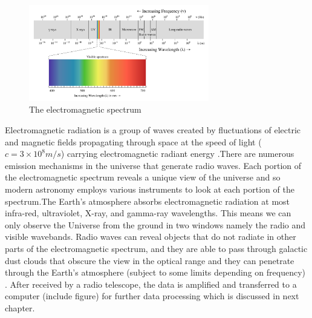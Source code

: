\begin{figure}[h!]
  \centering
    \includegraphics[width=0.7\textwidth]{images/Electromagnetic-Spectrum.png}
    \caption{The electromagnetic spectrum}
  \label{images/Electromagnetic-Spectrum.png}
\end{figure}

Electromagnetic radiation is a group of waves created by fluctuations of electric and magnetic fields propagating through space at the speed of light ($c=3\times 10^{8} m/s$) carrying electromagnetic radiant energy \citep{staats2016genetic}.\;There are numerous emission mechanisms in the universe that generate radio waves.
Each portion of the electromagnetic spectrum reveals a unique view of the universe and so modern astronomy employs various instruments to look at each portion of the spectrum.\;The Earth's atmosphere absorbs electromagnetic radiation at most infra-red, ultraviolet, X-ray, and gamma-ray wavelengths. This means we can only observe the Universe from the ground in two windows namely the radio and visible wavebands. Radio waves can reveal objects that do not radiate in other parts of the electromagnetic spectrum, and they are able to pass through galactic dust clouds that obscure the view in the optical range and they can penetrate through the Earth's atmosphere (subject to some limits depending on frequency) \citep{thompson2001interferometry}. After received by a radio telescope, the data is amplified and transferred to a computer (include figure) for further  data processing which is discussed in next chapter.


